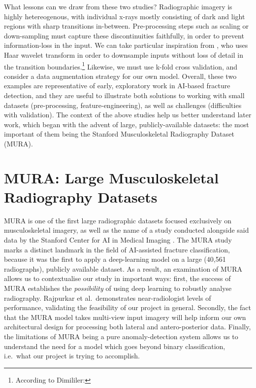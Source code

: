 What lessons can we draw from these two studies? Radiographic imagery is highly hetereogenous, with individual x-rays mostly consisting of dark and light regions with sharp transitions in-between. Pre-processing steps such as scaling or down-sampling must capture these discontinuities faithfully, in order to prevent information-loss in the input. We can take particular inspiration from \autocite{Dimililer2017}, who uses Haar wavelet transform in order to downsample inputs without loss of detail in the transition boundaries.\footnote{According to Dimililer: } Likewise, we must use k-fold cross validation, and consider a data augmentation strategy for our own model. Overall, these two examples are representative of early, exploratory work in AI-based fracture detection, and they are useful to illustrate both solutions to working with small datasets (pre-processing, feature-engineering), as well as challenges (difficulties with validation). The context of the above studies help us better understand later work, which began with the advent of large, publicly-available datasets: the most important of them being the Stanford Musculoskeletal Radiography Dataset (MURA).

\section{MURA: Large Musculoskeletal Radiography Datasets}



MURA is one of the first large radiographic datasets focused exclusively on musculoskeletal imagery, as well as the name of a study conducted alongside said data by the Stanford Center for AI in Medical Imaging \autocite{MURA2017}. The MURA study marks a distinct landmark in the field of AI-assisted fracture classification, because it was the first to apply a deep-learning model on a large (40,561 radiographs), publicly available dataset. As a result, an examination of MURA allows us to contextualise our study in important ways: first, the success of MURA establishes the \emph{possibility} of using deep learning to robustly analyse radiography. Rajpurkar et al.~demonstrates near-radiologist levels of performance, validating the feasibility of our project in general. Secondly, the fact that the MURA model takes multi-view input imagery will help inform our own architectural design for processing both lateral and antero-posterior data. Finally, the limitations of MURA being a pure anomaly-detection system allows us to understand the need for a model which goes beyond binary classification, i.e.~what our project is trying to accomplish. 

